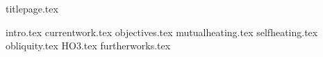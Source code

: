 \documentclass[twoside, twocolumn]{article}
\begin{document}
{titlepage.tex}

{intro.tex}
{currentwork.tex}
{objectives.tex}
{mutualheating.tex}
{selfheating.tex}
{obliquity.tex}
{HO3.tex}
{furtherworks.tex}

\nocite{*}
\end{document}
